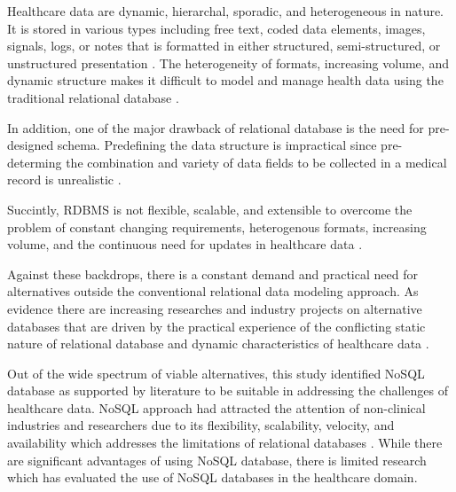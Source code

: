 \documentclass[5p]{elsarticle}
\begin{document}
Healthcare data are dynamic, hierarchal, sporadic, and heterogeneous in nature. 
It is stored in various types including free text, coded data elements, images, signals, logs, or notes that is formatted in either structured, semi-structured, 
or unstructured presentation \cite{M.Ercan190510,K.Lee201299,C.S.Kruse201638,S.White201413,S.Wasan1192016}.
The heterogeneity of formats, increasing volume, and dynamic structure makes it difficult to model and manage health 
data using the traditional relational database \cite{K.Lee201299,H.Al-Fatlawi2015122,O.Schmitt20121,Y.Jin2011288}.

In addition, one of the major drawback of relational database is the need for pre-designed schema. 
Predefining the data structure is impractical since pre-determing the combination and variety of data fields to be collected in a medical record is unrealistic \cite{K.Lee201299}. 

Succintly, RDBMS is not flexible, scalable, and extensible to overcome the problem of constant changing requirements, heterogenous formats, increasing volume, and the continuous need for updates in healthcare data \cite{Z.Goli-Malekabadi201675,K.Lee201299,H.Al-Fatlawi2015122,O.Schmitt20121,Y.Jin2011288}.

Against these backdrops, there is a constant demand and practical need for alternatives outside the conventional relational data modeling approach. 
As evidence there are increasing researches and industry projects on alternative databases that are driven by the practical experience of the conflicting static 
nature of relational database and dynamic characteristics of healthcare data \cite{M.Ercan190510}.

Out of the wide spectrum of viable alternatives, this study identified NoSQL database as supported by literature to be suitable in addressing the challenges of 
healthcare data. NoSQL approach had attracted the attention of non-clinical industries \cite{C.S.Kruse201638,Z.Parker20131,G.D.Ferreira2013125} and researchers 
due to its flexibility, scalability, velocity, and availability which addresses the limitations of relational databases \cite{M.Ercan190510}. 
While there are significant advantages of using NoSQL database, there is limited research which has evaluated the use of NoSQL databases in the healthcare domain.
\end{document}
